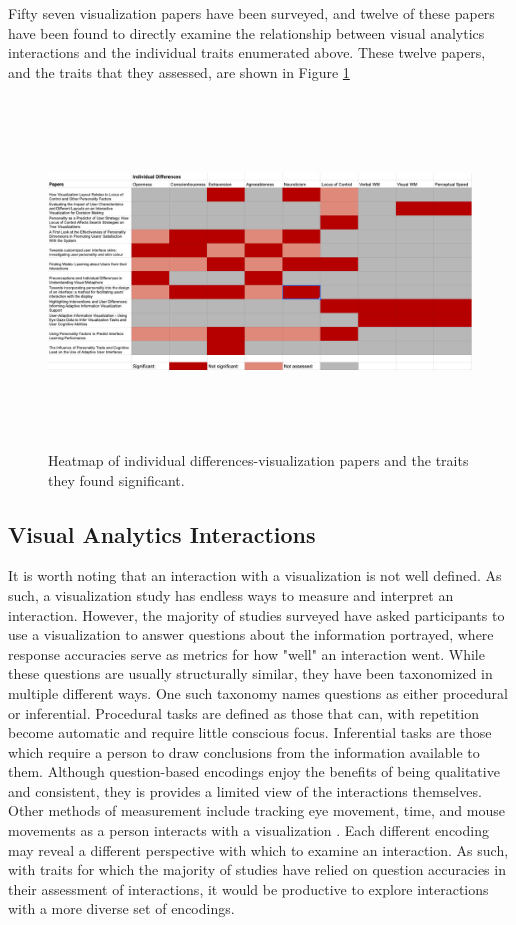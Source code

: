 \documentclass[conference]{IEEEtran}
\begin{document}
Fifty seven visualization papers have been surveyed, and twelve of these
papers have been found to directly examine the relationship between visual
analytics interactions and the individual traits enumerated above. These
twelve papers, and the traits that they assessed, are shown in Figure \ref{fig}
\begin{figure}[htbp]
    \centerline{\includegraphics[height=25em]{fig1.png}}
    \caption{Heatmap of individual differences-visualization papers and the traits
    they found significant.}
    \label{fig}
\end{figure}

\subsection{Visual Analytics Interactions}
It is worth noting that an interaction with a visualization is not well defined. As
such, a visualization study has endless ways to measure and interpret an interaction.
However, the majority of studies surveyed have asked participants to use a visualization
to answer questions about the information portrayed, where response accuracies
serve as metrics for how "well" an interaction went. While these questions are
usually structurally similar, they have been taxonomized in multiple different ways.
One such taxonomy names questions as either procedural or inferential\cite{Green2010UsingPF}.
Procedural tasks are defined as those that can, with repetition become automatic and require
little conscious focus. Inferential tasks are those which require a person to draw conclusions
from the information available to them. Although question-based encodings enjoy the
benefits of being qualitative and consistent, they is provides a limited view of the
interactions themselves. Other methods of measurement include tracking eye movement,
time, and mouse movements as a person interacts with a visualization
\cite{Green2010UsingPF, Waldo}. Each different encoding may reveal a different perspective
with which to examine an interaction. As such, with traits for which the majority of studies
have relied on question accuracies in their assessment of interactions, it would be productive
to explore interactions with a more diverse set of encodings.
\end{document}
